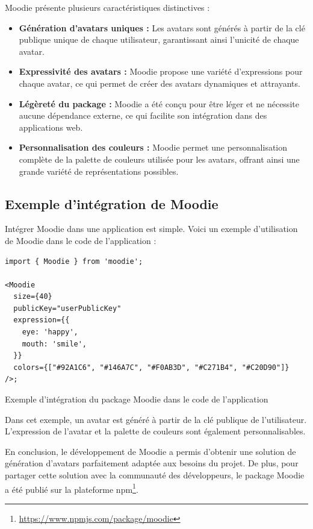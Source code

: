 Moodie présente plusieurs caractéristiques distinctives :

\begin{itemize}
    \item \textbf{Génération d'avatars uniques :} Les avatars sont générés à partir de la clé publique unique de chaque utilisateur, garantissant ainsi l'unicité de chaque avatar.
    \item \textbf{Expressivité des avatars :} Moodie propose une variété d'expressions pour chaque avatar, ce qui permet de créer des avatars dynamiques et attrayants.
    \item \textbf{Légèreté du package :} Moodie a été conçu pour être léger et ne nécessite aucune dépendance externe, ce qui facilite son intégration dans des applications web.
    \item \textbf{Personnalisation des couleurs :} Moodie permet une personnalisation complète de la palette de couleurs utilisée pour les avatars, offrant ainsi une grande variété de représentations possibles.
\end{itemize}

\subsection{Exemple d'intégration de Moodie}

Intégrer Moodie dans une application est simple. Voici un exemple d'utilisation de Moodie dans le code de l'application :

\begin{listing}[H]
    \begin{verbatim}
import { Moodie } from 'moodie';

<Moodie
  size={40}
  publicKey="userPublicKey"
  expression={{
    eye: 'happy',
    mouth: 'smile',
  }}
  colors={["#92A1C6", "#146A7C", "#F0AB3D", "#C271B4", "#C20D90"]}
/>;
  \end{verbatim}
    \caption{Exemple d'intégration du package Moodie dans le code de l'application}
\end{listing}

Dans cet exemple, un avatar est généré à partir de la clé publique de l'utilisateur. L'expression de l'avatar et la palette de couleurs sont également personnalisables.

En conclusion, le développement de Moodie a permis d'obtenir une solution de génération d'avatars parfaitement adaptée aux besoins du projet. De plus, pour partager cette solution avec la communauté des développeurs, le package Moodie a été publié sur la plateforme npm\footnote{\url{https://www.npmjs.com/package/moodie}}.

